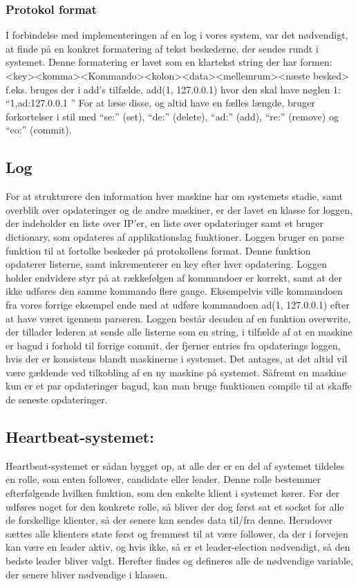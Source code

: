 \documentclass[a4paper,12pt]{article}
\begin{document}
\subsubsection{Protokol format}
I forbindelse med implementeringen af en log i vores system, var det nødvendigt, at finde på en konkret formatering af tekst beskederne, der sendes rundt i systemet.
Denne formatering er lavet som en klartekst string der har formen:
<key><komma><Kommando><kolon><data><mellemrum><næste besked>
f.eks. bruges der i add’s tilfælde, add(1, 127.0.0.1) hvor den skal have nøglen 1: 
“1,ad:127.0.0.1 ”
For at læse disse, og altid have en fælles længde, bruger forkortelser i stil med “se:” (set), “de:” (delete), “ad:” (add), “re:” (remove) og “co:” (commit). 


\subsection{Log}
For at strukturere den information hver maskine har om systemets stadie, samt overblik over opdateringer og de andre maskiner, er der lavet en klasse for loggen, der indeholder en liste over IP’er, en liste over opdateringer samt et bruger dictionary, som opdateres af applikationslag funktioner.
Loggen bruger en parse funktion til at fortolke beskeder på protokollens format. 
Denne funktion opdaterer listerne, samt inkrementerer en key efter hver opdatering. Loggen holder endvidere styr på at rækkefølgen af kommandoer er korrekt, samt at der ikke udføres den samme kommando flere gange.
Eksempelvis ville kommandoen fra vores forrige eksempel ende med at udføre kommandoen ad(1, 127.0.0.1) efter at have været igennem parseren. 
Loggen består desuden af en funktion overwrite, der tillader lederen at sende alle listerne som en string, i tilfælde af at en maskine er bagud i forhold til forrige commit, der fjerner entries fra opdaterings loggen, hvis der er konsistens blandt maskinerne i systemet. Det antages, at det altid vil være gældende ved tilkobling af en ny maskine på systemet.
Såfremt en maskine kun er et par opdateringer bagud, kan man bruge funktionen compile til at skaffe de seneste opdateringer.



\subsection{Heartbeat-systemet:}
Heartbeat-systemet er sådan bygget op, at alle der er en del af systemet tildeles en rolle, som enten follower, candidate eller leader. Denne rolle bestemmer efterfølgende hvilken funktion, som den enkelte klient i systemet kører.
Før der udføres noget for den konkrete rolle, så bliver der dog først sat et socket for alle de forskellige klienter, så der senere kan sendes data til/fra denne.
Herudover sættes alle klienters state først og fremmest til at være follower, da der i forvejen kan være en leader aktiv, og hvis ikke, så er et leader-election nødvendigt, så den bedste leader bliver valgt.
Herefter findes og defineres alle de nødvendige variable, der senere bliver nødvendige i klassen.
\end{document}
